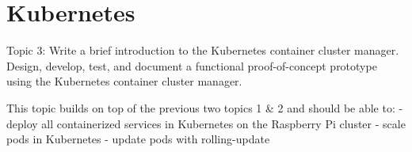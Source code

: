 \chapter{Kubernetes}\label{ch:kubernetes}
Topic 3: Write a brief introduction to the Kubernetes container cluster manager. 
Design, develop, test, and document a functional proof-of-concept prototype using the Kubernetes container cluster manager. 





This topic builds on top of the previous two topics 1 & 2 and should be able to:
- deploy all containerized services in Kubernetes on the Raspberry Pi cluster
- scale pods in Kubernetes
- update pods with rolling-update


